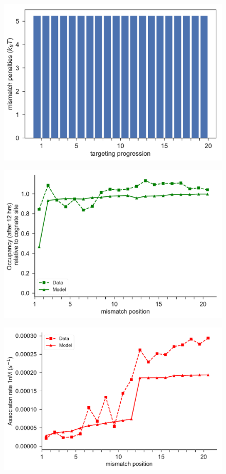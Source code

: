 \documentclass[a4paper,twoside]{revtex4-1}
\begin{document}
\begin{figure}[H]
\includegraphics[scale=0.5]{fig33_10_10_2018.pdf}
\end{figure}

\begin{figure}[H]
\includegraphics[scale=0.5]{fig34_10_10_2018.pdf}
\end{figure}

\begin{figure}[H]
\includegraphics[scale=0.5]{fig35_10_10_2018.pdf}
\end{figure}
\end{document}

